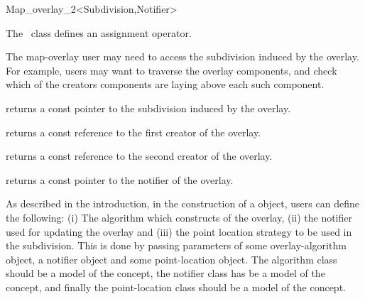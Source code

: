 \begin{ccRefClass}{Map_overlay_2<Subdivision,Notifier>}

The \ccClassTemplateName\ class defines an assignment operator.



The map-overlay user may need to access the subdivision induced by the 
overlay. 
For example, users may want to traverse the overlay components, 
and check which of the creators components are laying above each 
such component.

{returns a const pointer to the subdivision induced by the overlay.}


{returns a const reference to the first creator of the overlay.}

{returns a const reference to the second creator of the overlay.}

{returns a const pointer to the notifier of the overlay.}

\begin{ccAdvanced}


As described in the introduction, in the construction of 
a  object, users can define 
the following:
(i) The algorithm which constructs of the overlay, 
(ii) the notifier used for updating the overlay and 
(iii) the point location strategy to be used in the subdivision. 
This is done by passing parameters of some overlay-algorithm object, 
a notifier object and some point-location object. 
The algorithm class should be a model of the 
 concept, the notifier class has be a model 
of the  concept, and finally the 
point-location class should be a model of the
 concept. 


\end{ccAdvanced}
\end{ccRefClass}
